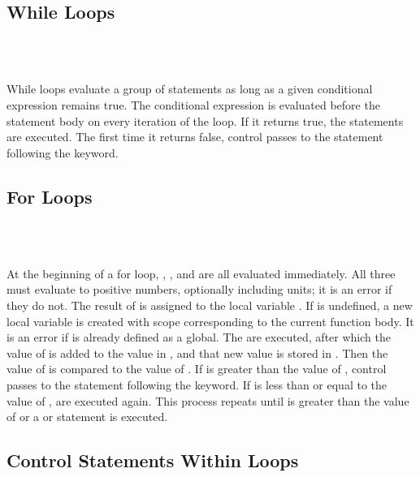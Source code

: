 \subsection{While Loops}

\begin{syntax}
 \expr{}  \\
\codeindent\statements{} \\
\end{syntax}

While loops evaluate a group of statements as long as a given
conditional expression remains true.  The conditional expression is
evaluated before the statement body on every iteration of the loop.
If it returns true, the statements are executed.  The first time it
returns false, control passes to the statement following the
 keyword.


\subsection{For Loops}

\begin{syntax}
 \id{}        \\
\codeindent \statements{} \\
\end{syntax}

At the beginning of a for loop, , , and  are
all evaluated immediately.  All three must evaluate to positive
numbers, optionally including units; it is an error if they do not.
The result of  is assigned to the local variable \id{}.  If
\id{} is undefined, a new local variable is created with scope
corresponding to the current function body.  It is an error if \id{}
is already defined as a global.  The \statements{} are executed, after
which the value of  is added to the value in \id{}, and that
new value is stored in \id{}.  Then the value of \id{} is compared to
the value of .  If \id{} is greater than the value of
, control passes to the statement following the 
keyword.  If \id{} is less than or equal to the value of ,
\statements{} are executed again.  This process repeats until \id{} is
greater than the value of  or a  or 
statement is executed.


\subsection{Control Statements Within Loops}

